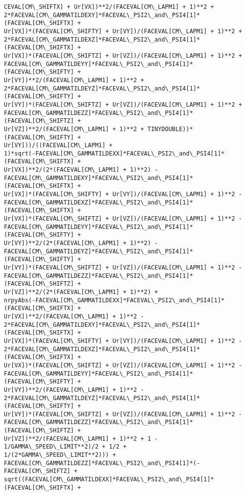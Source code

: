 \documentclass[landscape,letterpaper,10pt,english]{article}
\begin{document}
\begin{Verbatim}[commandchars=\\\{\}]
CEVAL[CM\_SHIFTX] + Ur[VX])**2/(FACEVAL[CM\_LAPM1] + 1)**2 +
2*FACEVAL[CM\_GAMMATILDEXY]*FACEVAL\_PSI2\_and\_PSI4[1]*(FACEVAL[CM\_SHIFTX] +
Ur[VX])*(FACEVAL[CM\_SHIFTY] + Ur[VY])/(FACEVAL[CM\_LAPM1] + 1)**2 +
2*FACEVAL[CM\_GAMMATILDEXZ]*FACEVAL\_PSI2\_and\_PSI4[1]*(FACEVAL[CM\_SHIFTX] +
Ur[VX])*(FACEVAL[CM\_SHIFTZ] + Ur[VZ])/(FACEVAL[CM\_LAPM1] + 1)**2 +
FACEVAL[CM\_GAMMATILDEYY]*FACEVAL\_PSI2\_and\_PSI4[1]*(FACEVAL[CM\_SHIFTY] +
Ur[VY])**2/(FACEVAL[CM\_LAPM1] + 1)**2 +
2*FACEVAL[CM\_GAMMATILDEYZ]*FACEVAL\_PSI2\_and\_PSI4[1]*(FACEVAL[CM\_SHIFTY] +
Ur[VY])*(FACEVAL[CM\_SHIFTZ] + Ur[VZ])/(FACEVAL[CM\_LAPM1] + 1)**2 +
FACEVAL[CM\_GAMMATILDEZZ]*FACEVAL\_PSI2\_and\_PSI4[1]*(FACEVAL[CM\_SHIFTZ] +
Ur[VZ])**2/(FACEVAL[CM\_LAPM1] + 1)**2 + TINYDOUBLE))*(FACEVAL[CM\_SHIFTY] +
Ur[VY]))/((FACEVAL[CM\_LAPM1] +
1)*sqrt(-FACEVAL[CM\_GAMMATILDEXX]*FACEVAL\_PSI2\_and\_PSI4[1]*(FACEVAL[CM\_SHIFTX] +
Ur[VX])**2/(2*(FACEVAL[CM\_LAPM1] + 1)**2) -
FACEVAL[CM\_GAMMATILDEXY]*FACEVAL\_PSI2\_and\_PSI4[1]*(FACEVAL[CM\_SHIFTX] +
Ur[VX])*(FACEVAL[CM\_SHIFTY] + Ur[VY])/(FACEVAL[CM\_LAPM1] + 1)**2 -
FACEVAL[CM\_GAMMATILDEXZ]*FACEVAL\_PSI2\_and\_PSI4[1]*(FACEVAL[CM\_SHIFTX] +
Ur[VX])*(FACEVAL[CM\_SHIFTZ] + Ur[VZ])/(FACEVAL[CM\_LAPM1] + 1)**2 -
FACEVAL[CM\_GAMMATILDEYY]*FACEVAL\_PSI2\_and\_PSI4[1]*(FACEVAL[CM\_SHIFTY] +
Ur[VY])**2/(2*(FACEVAL[CM\_LAPM1] + 1)**2) -
FACEVAL[CM\_GAMMATILDEYZ]*FACEVAL\_PSI2\_and\_PSI4[1]*(FACEVAL[CM\_SHIFTY] +
Ur[VY])*(FACEVAL[CM\_SHIFTZ] + Ur[VZ])/(FACEVAL[CM\_LAPM1] + 1)**2 -
FACEVAL[CM\_GAMMATILDEZZ]*FACEVAL\_PSI2\_and\_PSI4[1]*(FACEVAL[CM\_SHIFTZ] +
Ur[VZ])**2/(2*(FACEVAL[CM\_LAPM1] + 1)**2) +
nrpyAbs(-FACEVAL[CM\_GAMMATILDEXX]*FACEVAL\_PSI2\_and\_PSI4[1]*(FACEVAL[CM\_SHIFTX] +
Ur[VX])**2/(FACEVAL[CM\_LAPM1] + 1)**2 -
2*FACEVAL[CM\_GAMMATILDEXY]*FACEVAL\_PSI2\_and\_PSI4[1]*(FACEVAL[CM\_SHIFTX] +
Ur[VX])*(FACEVAL[CM\_SHIFTY] + Ur[VY])/(FACEVAL[CM\_LAPM1] + 1)**2 -
2*FACEVAL[CM\_GAMMATILDEXZ]*FACEVAL\_PSI2\_and\_PSI4[1]*(FACEVAL[CM\_SHIFTX] +
Ur[VX])*(FACEVAL[CM\_SHIFTZ] + Ur[VZ])/(FACEVAL[CM\_LAPM1] + 1)**2 -
FACEVAL[CM\_GAMMATILDEYY]*FACEVAL\_PSI2\_and\_PSI4[1]*(FACEVAL[CM\_SHIFTY] +
Ur[VY])**2/(FACEVAL[CM\_LAPM1] + 1)**2 -
2*FACEVAL[CM\_GAMMATILDEYZ]*FACEVAL\_PSI2\_and\_PSI4[1]*(FACEVAL[CM\_SHIFTY] +
Ur[VY])*(FACEVAL[CM\_SHIFTZ] + Ur[VZ])/(FACEVAL[CM\_LAPM1] + 1)**2 -
FACEVAL[CM\_GAMMATILDEZZ]*FACEVAL\_PSI2\_and\_PSI4[1]*(FACEVAL[CM\_SHIFTZ] +
Ur[VZ])**2/(FACEVAL[CM\_LAPM1] + 1)**2 + 1 - 1/GAMMA\_SPEED\_LIMIT**2)/2 + 1/2 +
1/(2*GAMMA\_SPEED\_LIMIT**2))) +
FACEVAL[CM\_GAMMATILDEZZ]*FACEVAL\_PSI2\_and\_PSI4[1]*(-FACEVAL[CM\_SHIFTZ] +
sqrt((FACEVAL[CM\_GAMMATILDEXX]*FACEVAL\_PSI2\_and\_PSI4[1]*(FACEVAL[CM\_SHIFTX] +

\end{Verbatim}
\end{document}
